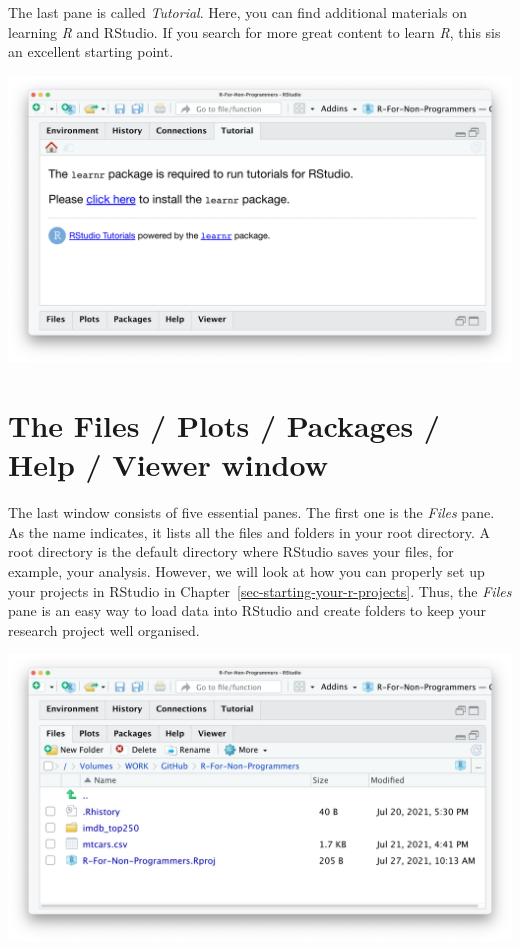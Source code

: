 \documentclass[
  letterpaper,
]{krantz}
\begin{document}
The last pane is called \emph{Tutorial}. Here, you can find additional
materials on learning \emph{R} and RStudio. If you search for more great
content to learn \emph{R}, this sis an excellent starting point.

\includegraphics{images/chapter_04_img/04_environment_history_etc/04_rstudio_tutorial.png}

\section{The Files / Plots / Packages / Help / Viewer
window}\label{sec-the-files-plots-packages-help-viewer-window}

The last window consists of five essential panes. The first one is the
\emph{Files} pane. As the name indicates, it lists all the files and
folders in your root directory. A root directory is the default
directory where RStudio saves your files, for example, your analysis.
However, we will look at how you can properly set up your projects in
RStudio in Chapter~\ref{sec-starting-your-r-projects}. Thus, the
\emph{Files} pane is an easy way to load data into RStudio and create
folders to keep your research project well organised.

\includegraphics{images/chapter_04_img/05_files_plots_etc/01_rstudio_files.png}
\end{document}
